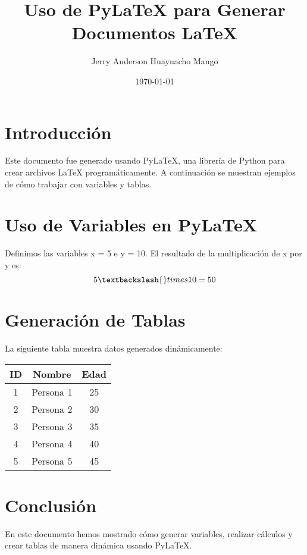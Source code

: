 \documentclass{article}%
\title{Uso de PyLaTeX para Generar Documentos LaTeX}%
\author{Jerry Anderson Huaynacho Mango}%
\date{\today}%
\begin{document}
%
\normalsize%
\maketitle%
\section{Introducción}%
\label{sec:Introduccin}%
Este documento fue generado usando PyLaTeX, una librería de Python para crear archivos LaTeX programáticamente.%
 A continuación se muestran ejemplos de cómo trabajar con variables y tablas.

%
\section{Uso de Variables en PyLaTeX}%
\label{sec:UsodeVariablesenPyLaTeX}%
Definimos las variables x = 5 e y = 10.%
El resultado de la multiplicación de x por y es: %
\[%
5 \textbackslash{}times 10 = 50%
\]

%
\section{Generación de Tablas}%
\label{sec:GeneracindeTablas}%
La siguiente tabla muestra datos generados dinámicamente:%
\begin{tabular}{|c|c|c|}%
\hline%
ID&Nombre&Edad\\%
\hline%
1&Persona 1&25\\%
\hline%
2&Persona 2&30\\%
\hline%
3&Persona 3&35\\%
\hline%
4&Persona 4&40\\%
\hline%
5&Persona 5&45\\%
\hline%
\end{tabular}

%
\section{Conclusión}%
\label{sec:Conclusin}%
En este documento hemos mostrado cómo generar variables, realizar cálculos y crear tablas de manera dinámica usando PyLaTeX.

%
\end{document}
